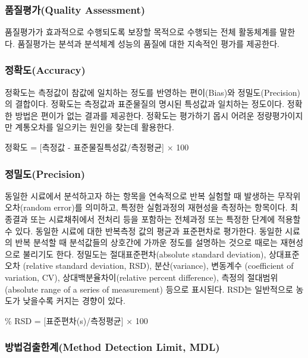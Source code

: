 \documentclass[
]{book}
\begin{document}
\hypertarget{uxd488uxc9c8uxd3c9uxac00quality-assessment}{%
\subsubsection{품질평가(Quality Assessment)}\label{uxd488uxc9c8uxd3c9uxac00quality-assessment}}

품질평가가 효과적으로 수행되도록 보장할 목적으로 수행되는 전체 활동체계를 말한다. 품질평가는 분석과 분석체계 성능의 품질에 대한 지속적인 평가를 제공한다.

\hypertarget{uxc815uxd655uxb3c4accuracy}{%
\subsubsection{정확도(Accuracy)}\label{uxc815uxd655uxb3c4accuracy}}

정확도는 측정값이 참값에 일치하는 정도를 반영하는 편이(Bias)와 정밀도(Precision)의 결합이다. 정확도는 측정값과 표준물질의 명시된 특성값과 일치하는 정도이다. 정확한 방법은 편이가 없는 결과를 제공한다. 정확도는 평가하기 몹시 어려운 정량평가이지만 계통오차를 일으키는 원인을 찾는데 활용한다.

정확도 = {[}측정값 - 표준물질특성값/측정평균{]} × 100

\hypertarget{uxc815uxbc00uxb3c4precision}{%
\subsubsection{정밀도(Precision)}\label{uxc815uxbc00uxb3c4precision}}

동일한 시료에서 분석하고자 하는 항목을 연속적으로 반복 실험할 때 발생하는 무작위오차(random error)를 의미하고, 특정한 실험과정의 재현성을 측정하는 항목이다. 최종결과 또는 시료채취에서 전처리 등을 포함하는 전체과정 또는 특정한 단계에 적용할 수 있다. 동일한 시료에 대한 반복측정 값의 평균과 표준편차로 평가한다. 동일한 시료의 반복 분석할 때 분석값들의 상호간에 가까운 정도를 설명하는 것으로 때로는 재현성으로 불리기도 한다. 정밀도는 절대표준편차(absolute standard deviation), 상대표준오차 (relative standard deviation, RSD), 분산(variance), 변동계수 (coefficient of variation, CV), 상대백분율차이(relative percent difference), 측정의 절대범위(absolute range of a series of measurement) 등으로 표시된다. RSD는 일반적으로 농도가 낮을수록 커지는 경향이 있다.

\% RSD = {[}표준편차(s)/측정평균{]} × 100

\hypertarget{uxbc29uxbc95uxac80uxcd9cuxd55cuxacc4method-detection-limit-mdl}{%
\subsubsection{방법검출한계(Method Detection Limit, MDL)}\label{uxbc29uxbc95uxac80uxcd9cuxd55cuxacc4method-detection-limit-mdl}}
\end{document}
